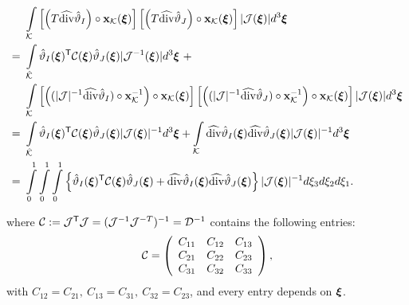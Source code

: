 \begin{align}
                                        \ & \int\limits_{\mathcal{K}}
                                        \left[\left(T\widehat{\operatorname{div}}\hat{\vartheta}_I\right)\circ\mathbf{x}_{\mathcal{K}}(\boldsymbol{\xi})\right] \left[\left(T\widehat{\operatorname{div}}\hat{\vartheta}_J\right)\circ\mathbf{x}_{\mathcal{K}}(\boldsymbol{\xi})\right]|\mathcal{J}(\boldsymbol{\xi})|d^3\boldsymbol{\xi} \nonumber\\ 
                                        =\ & \int\limits_{\hat{\mathcal{K}}}
                                        \hat{\vartheta}_I(\boldsymbol{\xi})^{\mathsf{T}}\mathcal{C}(\boldsymbol{\xi})\hat{\vartheta}_J(\boldsymbol{\xi})|\mathcal{J}^{-1}(\boldsymbol{\xi})|d^3\boldsymbol{\xi} \ +\nonumber\\*
                                        \ & \int\limits_{\mathcal{K}}
                                        \left[\left((|\mathcal{J}|^{-1}\widehat{\operatorname{div}}\hat{\vartheta}_I)\circ\mathbf{x}_{\mathcal{K}}^{-1}\right)\circ\mathbf{x}_{\mathcal{K}}(\boldsymbol{\xi})\right] \left[\left((|\mathcal{J}|^{-1}\widehat{\operatorname{div}}\hat{\vartheta}_J)\circ\mathbf{x}_{\mathcal{K}}^{-1}\right)\circ\mathbf{x}_{\mathcal{K}}(\boldsymbol{\xi})\right]|\mathcal{J}(\boldsymbol{\xi})|d^3\boldsymbol{\xi} \nonumber\\ 
                                        =\ & \int\limits_{\hat{\mathcal{K}}}
                                        \hat{\vartheta}_I(\boldsymbol{\xi})^{\mathsf{T}}\mathcal{C}(\boldsymbol{\xi})\hat{\vartheta}_J(\boldsymbol{\xi})|\mathcal{J}(\boldsymbol{\xi})|^{-1}d^3\boldsymbol{\xi} +
                                        \int\limits_{\mathcal{K}}             \widehat{\operatorname{div}}\hat{\vartheta}_I(\boldsymbol{\xi})\widehat{\operatorname{div}}\hat{\vartheta}_J(\boldsymbol{\xi})|\mathcal{J}(\boldsymbol{\xi})|^{-1}d^3\boldsymbol{\xi} \nonumber \\ 
                                        =\ & \int\limits_0^1\int\limits_0^1\int\limits_0^1\left\{\hat{\vartheta}_I(\boldsymbol{\xi})^{\mathsf{T}}\mathcal{C}(\boldsymbol{\xi})\hat{\vartheta}_J(\boldsymbol{\xi})+\widehat{\operatorname{div}}\hat{\vartheta}_I(\boldsymbol{\xi})\widehat{\operatorname{div}}\hat{\vartheta}_J(\boldsymbol{\xi})\right\}|\mathcal{J}(\boldsymbol{\xi})|^{-1}d\xi_3d\xi_2d\xi_1.
    \label{hdivip_coupled}
\end{align}

\noindent where $\mathcal{C}:=\mathcal{J}^{\mathsf{T}}\mathcal{J}=(\mathcal{J}^{-1}\mathcal{J}^{-T})^{-1}=\mathcal{D}^{-1}$ contains the following entries:
% 
\begin{equation}
    \mathcal{C}=\left(
    \begin{array}{ccc}
         C_{11} & C_{12} & C_{13}  \\
         C_{21} & C_{22} & C_{23}  \\
         C_{31} & C_{32} & C_{33}
    \end{array}\right),
    \label{def_C}
\end{equation}
% 
with $C_{12}=C_{21},\ C_{13}=C_{31},\ C_{32}=C_{23}$, and every entry depends on $\boldsymbol{\xi}$.

